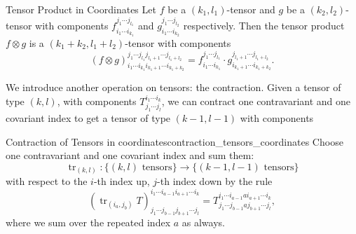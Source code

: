 


\begin{colorlem}{Tensor Product in Coordinates}{}
Let $f$ be a $(k_1, l_1)$-tensor and $g$ be a $(k_2, l_2)$-tensor with components $f_{i_1 \cdots i_{k_1}}^{j_1 \cdots j_{l_1}}$ and $g_{i_1 \cdots i_{k_2}}^{j_1 \cdots j_{l_2}}$ respectively. Then the tensor product $f \otimes g$ is a $(k_1 + k_2, l_1 + l_2)$-tensor with components
\[
(f \otimes g)_{i_1 \cdots i_{k_1} i_{k_1+1} \cdots i_{k_1+k_2}}^{j_1 \cdots j_{l_1} j_{l_1+1} \cdots j_{l_1+l_2}} = f_{i_1 \cdots i_{k_1}}^{j_1 \cdots j_{l_1}} \cdot g_{i_{k_1+1} \cdots i_{k_1+k_2}}^{j_{l_1+1} \cdots j_{l_1+l_2}}.
\]
\end{colorlem}



We introduce another operation on tensors: the contraction. Given a tensor of type $(k,l)$, with components $T^{i_1 \cdots i_k}_{j_1 \cdots j_l}$, we can contract one contravariant and one covariant index to get a tensor of type $(k-1, l-1)$ with components

\begin{colordef}{Contraction of Tensors in coordinates}{contraction_tensors_coordinates}
    Choose one contravariant and one covariant index and sum them:
\[
\operatorname{tr}_{(k,l)}: \{ (k, l) \text{ tensors} \} \longrightarrow \{ (k-1, l-1) \text{ tensors} \}
\]
with respect to the $i$-th index up, $j$-th index down by the rule
$$(\operatorname{tr}_{(i_a,j_b)} T)^{i_1 \cdots i_{a-1} i_{a+1} \cdots i_k}_{j_1 \cdots j_{b-1} j_{b+1} \cdots j_l} = T^{i_1 \cdots i_{a-1} a i_{a+1} \cdots i_k}_{j_1 \cdots j_{b-1} a j_{b+1} \cdots j_l},$$
where we sum over the repeated index $a$ as always.
\end{colordef}

